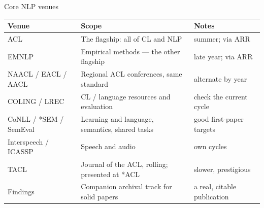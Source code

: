 \documentclass[aspectratio=169,11pt]{beamer}
\begin{document}
\begin{frame}{Core NLP venues}
\footnotesize
\begin{tabularx}{\textwidth}{>{\raggedright\arraybackslash}p{2.4cm} X >{\raggedright\arraybackslash}p{3.2cm}}
\toprule
\textbf{\color{brand}Venue} & \textbf{\color{brand}Scope} & \textbf{\color{brand}Notes} \\
\midrule
\rowcolor{rowtint}
ACL & The flagship: all of CL and NLP & summer; via ARR \\
EMNLP & Empirical methods --- the other flagship & late year; via ARR \\
\rowcolor{rowtint}
NAACL / EACL / AACL & Regional ACL conferences, same standard & alternate by year \\
COLING / LREC & CL / language resources and evaluation & check the current cycle \\
\rowcolor{rowtint}
CoNLL / *SEM / SemEval & Learning and language, semantics, shared tasks & good first-paper targets \\
Interspeech / ICASSP & Speech and audio & own cycles \\
\rowcolor{rowtint}
TACL & Journal of the ACL, rolling; presented at *ACL & slower, prestigious \\
Findings & Companion archival track for solid papers & a real, citable publication \\
\bottomrule
\end{tabularx}
\end{frame}
\end{document}
